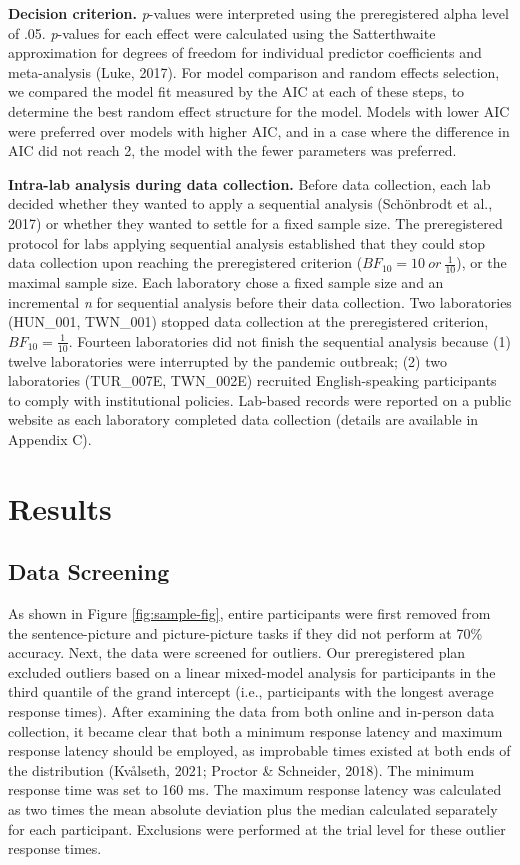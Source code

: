 \documentclass[
  man,floatsintext]{apa7}
\begin{document}
\textbf{Decision criterion.} \emph{p}-values were interpreted using the preregistered alpha level of .05. \emph{p}-values for each effect were calculated using the Satterthwaite approximation for degrees of freedom for individual predictor coefficients and meta-analysis (Luke, 2017). For model comparison and random effects selection, we compared the model fit measured by the AIC at each of these steps, to determine the best random effect structure for the model. Models with lower AIC were preferred over models with higher AIC, and in a case where the difference in AIC did not reach 2, the model with the fewer parameters was preferred.

\textbf{Intra-lab analysis during data collection.} Before data collection, each lab decided whether they wanted to apply a sequential analysis (Schönbrodt et al., 2017) or whether they wanted to settle for a fixed sample size. The preregistered protocol for labs applying sequential analysis established that they could stop data collection upon reaching the preregistered criterion (\(BF_{10} = 10\ or\ \frac{1}{10}\)), or the maximal sample size. Each laboratory chose a fixed sample size and an incremental \emph{n} for sequential analysis before their data collection. Two laboratories (HUN\_001, TWN\_001) stopped data collection at the preregistered criterion, \(BF_{10} = \frac{1}{10}\). Fourteen laboratories did not finish the sequential analysis because (1) twelve laboratories were interrupted by the pandemic outbreak; (2) two laboratories (TUR\_007E, TWN\_002E) recruited English-speaking participants to comply with institutional policies. Lab-based records were reported on a public website as each laboratory completed data collection (details are available in Appendix C).

\hypertarget{results}{%
\section{Results}\label{results}}

\hypertarget{data-screening}{%
\subsection{Data Screening}\label{data-screening}}

As shown in Figure \ref{fig:sample-fig}, entire participants were first removed from the sentence-picture and picture-picture tasks if they did not perform at 70\% accuracy. Next, the data were screened for outliers. Our preregistered plan excluded outliers based on a linear mixed-model analysis for participants in the third quantile of the grand intercept (i.e., participants with the longest average response times). After examining the data from both online and in-person data collection, it became clear that both a minimum response latency and maximum response latency should be employed, as improbable times existed at both ends of the distribution (Kvålseth, 2021; Proctor \& Schneider, 2018). The minimum response time was set to 160 ms. The maximum response latency was calculated as two times the mean absolute deviation plus the median calculated separately for each participant. Exclusions were performed at the trial level for these outlier response times.
\end{document}

